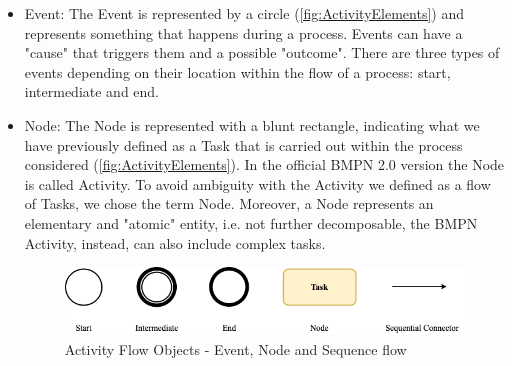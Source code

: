 \begin{itemize}
    \item Event: The Event is represented by a circle (\autoref{fig:ActivityElements}) and represents something that happens during a process. Events can have a "cause" that triggers them and a possible "outcome". There are three types of events depending on their location within the flow of a process: start, intermediate and end.
    \item Node: The Node is represented with a blunt rectangle, indicating what we have previously defined as a Task that is carried out within the process considered (\autoref{fig:ActivityElements}). In the official BMPN 2.0 version the Node is called Activity. To avoid ambiguity with the Activity we defined as a flow of Tasks, we chose the term Node. Moreover, a Node represents an elementary and "atomic" entity, i.e. not further decomposable, the BMPN Activity, instead, can also include complex tasks.
    \begin{figure}[h]
	\centering
	\includegraphics[width=12cm]{Figures/Conceptual Model/ActivityElements.png}
	\caption{Activity Flow Objects - Event, Node and Sequence flow}
	\label{fig:ActivityElements}
    \end{figure}


\end{itemize}
